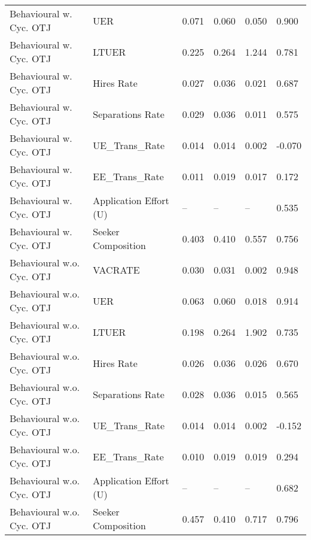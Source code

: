 \begin{table}[ht]
\begin{adjustbox}{width=\textwidth}
\begin{tabular}{llllll}
Behavioural w. Cyc. OTJ & UER & 0.071 & 0.060 & 0.050 & 0.900 \\
Behavioural w. Cyc. OTJ & LTUER & \cellcolor{yellow!25}0.225 & 0.264 & \cellcolor{yellow!25}1.244 & 0.781 \\
Behavioural w. Cyc. OTJ & Hires Rate & 0.027 & 0.036 & 0.021 & \cellcolor{yellow!25}0.687 \\
Behavioural w. Cyc. OTJ & Separations Rate & 0.029 & 0.036 & 0.011 & \cellcolor{yellow!25}0.575 \\
Behavioural w. Cyc. OTJ & UE_Trans_Rate & \cellcolor{yellow!25}0.014 & 0.014 & \cellcolor{yellow!25}0.002 & \cellcolor{yellow!25}-0.070 \\
Behavioural w. Cyc. OTJ & EE_Trans_Rate & 0.011 & 0.019 & \cellcolor{yellow!25}0.017 & 0.172 \\
Behavioural w. Cyc. OTJ & Application Effort (U) & -- & -- & -- & 0.535 \\
Behavioural w. Cyc. OTJ & Seeker Composition & \cellcolor{yellow!25}0.403 & 0.410 & \cellcolor{yellow!25}0.557 & 0.756 \\
Behavioural w.o. Cyc. OTJ & VACRATE & 0.030 & 0.031 & 0.002 & 0.948 \\
Behavioural w.o. Cyc. OTJ & UER & 0.063 & 0.060 & 0.018 & 0.914 \\
Behavioural w.o. Cyc. OTJ & LTUER & 0.198 & 0.264 & 1.902 & 0.735 \\
Behavioural w.o. Cyc. OTJ & Hires Rate & 0.026 & 0.036 & 0.026 & 0.670 \\
Behavioural w.o. Cyc. OTJ & Separations Rate & 0.028 & 0.036 & 0.015 & 0.565 \\
Behavioural w.o. Cyc. OTJ & UE_Trans_Rate & 0.014 & 0.014 & 0.002 & -0.152 \\
Behavioural w.o. Cyc. OTJ & EE_Trans_Rate & 0.010 & 0.019 & 0.019 & \cellcolor{yellow!25}0.294 \\
Behavioural w.o. Cyc. OTJ & Application Effort (U) & -- & -- & -- & \cellcolor{yellow!25}0.682 \\
Behavioural w.o. Cyc. OTJ & Seeker Composition & 0.457 & 0.410 & 0.717 & \cellcolor{yellow!25}0.796 \\
\bottomrule
\end{tabular}
\end{adjustbox}
\end{table}
